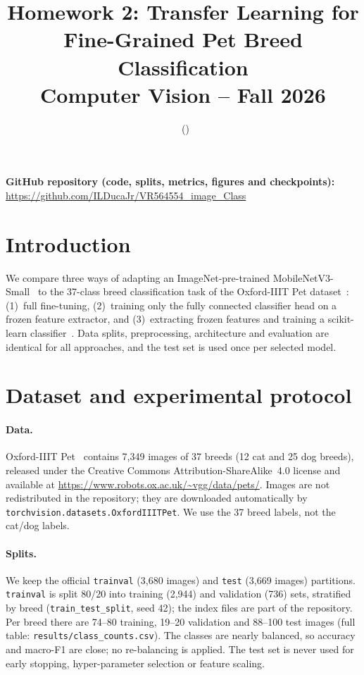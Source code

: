 \documentclass[11pt,a4paper]{article}
\title{Homework 2: Transfer Learning for Fine-Grained Pet Breed Classification\\
\large Computer Vision -- Fall 2026}
\author{\authorname\ (\studentid)}
\date{}
\begin{document}
\maketitle

\noindent\textbf{GitHub repository (code, splits, metrics, figures and checkpoints):}\\
\url{https://github.com/ILDucaJr/VR564554_image_Class}

\section{Introduction}
We compare three ways of adapting an ImageNet-pre-trained MobileNetV3-Small~\cite{mobilenetv3}
to the 37-class breed classification task of the Oxford-IIIT Pet dataset~\cite{pets}:
(1)~full fine-tuning, (2)~training only the fully connected classifier head on a frozen
feature extractor, and (3)~extracting frozen features and training a scikit-learn
classifier~\cite{sklearn}. Data splits, preprocessing, architecture and evaluation are
identical for all approaches, and the test set is used once per selected model.

\section{Dataset and experimental protocol}
\paragraph{Data.} Oxford-IIIT Pet~\cite{pets} contains 7{,}349 images of 37 breeds
(12 cat and 25 dog breeds), released under the Creative Commons Attribution-ShareAlike~4.0
license and available at \url{https://www.robots.ox.ac.uk/~vgg/data/pets/}. Images are not
redistributed in the repository; they are downloaded automatically by
\texttt{torchvision.datasets.OxfordIIITPet}. We use the 37 breed labels, not the
cat/dog labels.

\paragraph{Splits.} We keep the official \texttt{trainval} (3{,}680 images) and \texttt{test}
(3{,}669 images) partitions. \texttt{trainval} is split 80/20 into training (2{,}944) and
validation (736) sets, stratified by breed (\texttt{train\_test\_split}, seed 42); the index
files are part of the repository. Per breed there are 74--80 training, 19--20 validation and
88--100 test images (full table: \texttt{results/class\_counts.csv}). The classes are nearly
balanced, so accuracy and macro-F1 are close; no re-balancing is applied. The test set is
never used for early stopping, hyper-parameter selection or feature scaling.
\end{document}

